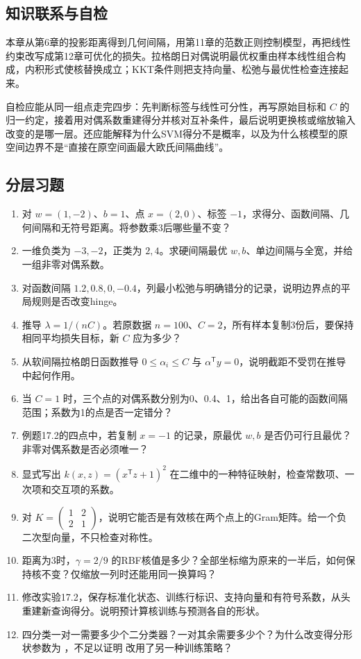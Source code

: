 \documentclass[UTF8,fontset=none,zihao=-4,a4paper]{ctexart}
\newcommand{\code}[1]{\texttt{\detokenize{#1}}}
\numberwithin{equation}{section}
\numberwithin{figure}{section}
\begin{document}
\subsection{知识联系与自检}
本章从第6章的投影距离得到几何间隔，用第11章的范数正则控制模型，再把线性约束改写成第12章可优化的损失。拉格朗日对偶说明最优权重由样本线性组合构成，内积形式使核替换成立；KKT条件则把支持向量、松弛与最优性检查连接起来。

自检应能从同一组点走完四步：先判断标签与线性可分性，再写原始目标和 $C$ 的归一约定，接着用对偶系数重建得分并核对互补条件，最后说明更换核或缩放输入改变的是哪一层。还应能解释为什么SVM得分不是概率，以及为什么核模型的原空间边界不是“直接在原空间画最大欧氏间隔曲线”。

\subsection{分层习题}
\begin{enumerate}[label=17.\arabic*]
\item 对 $w=(1,-2)$、$b=1$、点 $x=(2,0)$、标签 $-1$，求得分、函数间隔、几何间隔和无符号距离。将参数乘3后哪些量不变？
\item 一维负类为 $-3,-2$，正类为 $2,4$。求硬间隔最优 $w,b$、单边间隔与全宽，并给一组非零对偶系数。
\item 对函数间隔 $1.2,0.8,0,-0.4$，列最小松弛与明确错分的记录，说明边界点的平局规则是否改变hinge。
\item 推导 $\lambda=1/(nC)$。若原数据 $n=100$、$C=2$，所有样本复制3份后，要保持相同平均损失目标，新 $C$ 应为多少？
\item 从软间隔拉格朗日函数推导 $0\le\alpha_i\le C$ 与 $\alpha^{\mathsf T}y=0$，说明截距不受罚在推导中起何作用。
\item 当 $C=1$ 时，三个点的对偶系数分别为0、0.4、1，给出各自可能的函数间隔范围；系数为1的点是否一定错分？
\item 例题17.2的四点中，若复制 $x=-1$ 的记录，原最优 $w,b$ 是否仍可行且最优？非零对偶系数是否必须唯一？
\item 显式写出 $k(x,z)=(x^{\mathsf T}z+1)^2$ 在二维中的一种特征映射，检查常数项、一次项和交互项的系数。
\item 对 $K=\begin{pmatrix}1&2\\2&1\end{pmatrix}$，说明它能否是有效核在两个点上的Gram矩阵。给一个负二次型向量，不只检查对称性。
\item 距离为3时，$\gamma=2/9$ 的RBF核值是多少？全部坐标缩为原来的一半后，如何保持核不变？仅缩放一列时还能用同一换算吗？
\item 修改实验17.2，保存标准化状态、训练行标识、支持向量和有符号系数，从头重建新查询得分。说明预计算核训练与预测各自的形状。
\item 四分类一对一需要多少个二分类器？一对其余需要多少个？为什么改变得分形状参数为 \code{ovr}，不足以证明 \code{SVC} 改用了另一种训练策略？
\end{enumerate}
\end{document}
